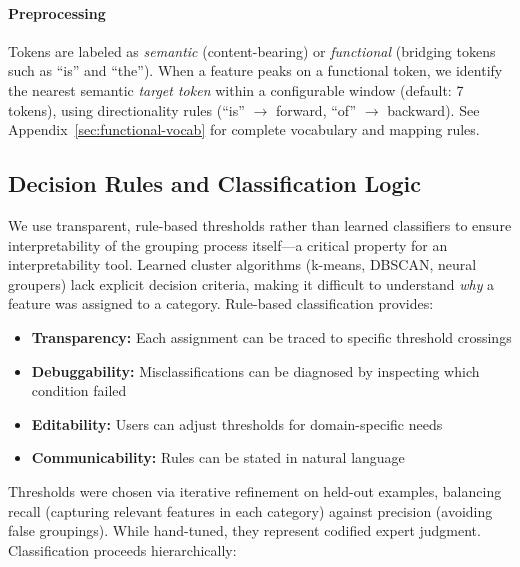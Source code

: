 \paragraph{Preprocessing}
Tokens are labeled as \emph{semantic} (content-bearing) or \emph{functional} (bridging tokens such as ``is'' and ``the''). When a feature peaks on a functional token, we identify the nearest semantic \emph{target token} within a configurable window (default: 7 tokens), using directionality rules (``is'' $\rightarrow$ forward, ``of'' $\rightarrow$ backward). See Appendix~\ref{sec:functional-vocab} for complete vocabulary and mapping rules.

\subsection{Decision Rules and Classification Logic}

We use transparent, rule-based thresholds rather than learned classifiers to ensure interpretability of the grouping process itself---a critical property for an interpretability tool. Learned cluster algorithms (k-means, DBSCAN, neural groupers) lack explicit decision criteria, making it difficult to understand \emph{why} a feature was assigned to a category. Rule-based classification provides:

\begin{itemize}
  \item \textbf{Transparency:} Each assignment can be traced to specific threshold crossings
  \item \textbf{Debuggability:} Misclassifications can be diagnosed by inspecting which condition failed
  \item \textbf{Editability:} Users can adjust thresholds for domain-specific needs
  \item \textbf{Communicability:} Rules can be stated in natural language
\end{itemize}

Thresholds were chosen via iterative refinement on held-out examples, balancing recall (capturing relevant features in each category) against precision (avoiding false groupings). While hand-tuned, they represent codified expert judgment. Classification proceeds hierarchically:

